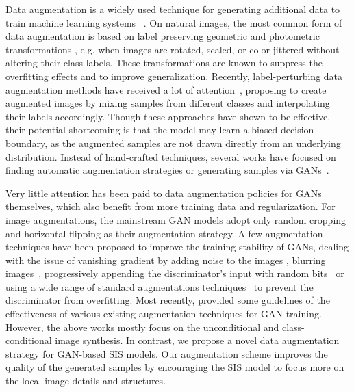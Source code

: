 \documentclass[final]{cvpr}
\makeatletter
\newcommand\+{\mkern4mu}
\renewcommand{\paragraph}{\@startsection{paragraph}{4}{\z@}{0.ex plus 0.ex minus .0ex}{-0.5em}{\normalsize\bf}}
\let\originalparagraph\paragraph
\renewcommand{\paragraph}[2][.]{\originalparagraph{#2#1}}
\makeatother
\begin{document}
\paragraph{Augmentation}

Data augmentation is a widely used technique for generating additional data to train machine learning systems
~\cite{Simard1992EfficientPR,Schlkopf1996IncorporatingII,Krizhevsky2012ImageNetCW,Taylor2018ImprovingDL,Cubuk2019AutoAugmentLA,Tokozume2018BetweenClassLF}. On natural images, the most common form of data augmentation is based on label preserving geometric and photometric transformations \cite{Krizhevsky2012ImageNetCW,Szegedy2016RethinkingTI}, e.g. when images are rotated, scaled, or color-jittered without altering their class labels. 
These transformations are known to suppress the overfitting effects and to improve generalization. 
Recently, label-perturbing data augmentation methods have received a lot of attention~\cite{zhang2018mixup,Verma2018ManifoldMB,Yun2019CutMixRS, harris2020fmix}, proposing to create augmented images by mixing samples from different classes and interpolating their labels accordingly.
Though these approaches have shown to be effective, their potential shortcoming is that the model may learn a biased decision boundary, as the augmented samples are not drawn directly from an underlying distribution. 
Instead of hand-crafted techniques, several works have focused on finding automatic augmentation strategies \cite{Lemley2017SmartAL,Cubuk2019AutoAugmentLA,Cubuk2019RandAugmentPD,Ratner2017LearningTC} or generating samples via GANs~\cite{Zhu2017DataAI,Sixt2018RenderGANGR,Antoniou2017DataAG}. 

Very little attention has been paid to data augmentation policies for GANs themselves, which also benefit from more training data and regularization. For image
augmentations, the mainstream GAN models adopt only random cropping and horizontal flipping as
their augmentation strategy.
A few augmentation techniques have been proposed to improve the training stability of GANs, dealing with the issue of vanishing gradient by adding noise to the images \cite{Sonderby2016AmortisedMI,Arjovsky2017TowardsPM}, blurring images~\cite{SajParMehSch18}, progressively appending the discriminator's input with random bits~\cite{Zhang2018PAGANIG} or
using a wide range of standard augmentations techniques~\cite{Karras2020TrainingGA} to prevent the discriminator from overfitting. Most recently, \cite{Zhao2020ImageAF} provided some guidelines of the effectiveness of various existing augmentation techniques for GAN training. However, the above works mostly focus on the unconditional and class-conditional image synthesis.
In contrast, we propose a novel data augmentation strategy for GAN-based SIS models. Our augmentation scheme improves the quality of the generated samples by encouraging the SIS model to focus more on the local image details and structures.
 	
\end{document}
